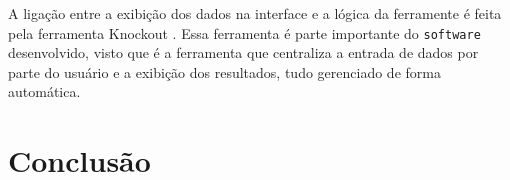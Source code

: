 \documentclass[12pt]{article}
\begin{document}
A ligação entre a exibição dos dados na interface e a lógica da ferramente é feita pela ferramenta Knockout
\cite{knockout}. Essa ferramenta é parte importante do \texttt{software} desenvolvido, visto que é a ferramenta que
centraliza a entrada de dados por parte do usuário e a exibição dos resultados, tudo gerenciado de forma automática.


\section{Conclusão}





\end{document}
